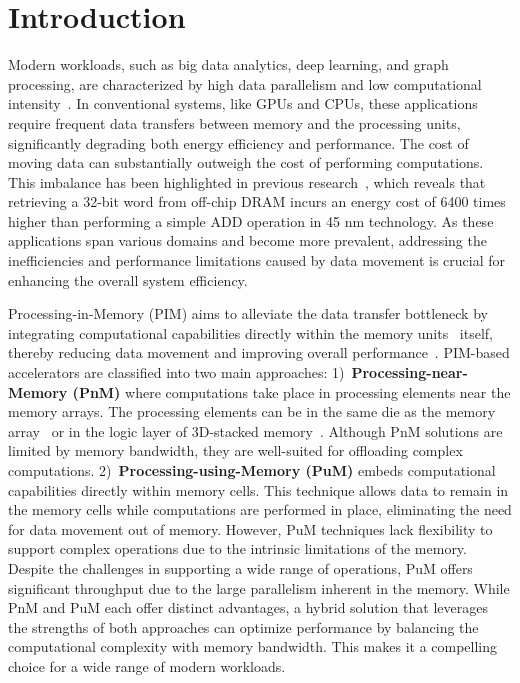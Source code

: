 
\section{Introduction}
Modern workloads, such as big data analytics, deep learning, and graph processing, are characterized by high data parallelism and low computational intensity~\cite{PnM_fpga}. In conventional systems, like GPUs and CPUs, these applications require frequent data transfers between memory and the processing units, significantly degrading both energy efficiency and performance. The cost of moving data can substantially outweigh the cost of performing computations. This imbalance has been highlighted in previous research~\cite{eie}, which reveals that retrieving a 32-bit word from off-chip DRAM incurs an energy cost of 6400 times higher than performing a simple ADD operation in 45 nm technology. As these applications span various domains and become more prevalent, addressing the inefficiencies and performance limitations caused by data movement is crucial for enhancing the overall system efficiency.

Processing-in-Memory (PIM) aims to alleviate the data transfer bottleneck by integrating computational capabilities directly within the memory units~\cite{ghoseprocessing} itself, thereby reducing data movement and improving overall performance~\cite{mutluprocessing}. PIM-based accelerators are classified into two main approaches: 1)~\textbf{Processing-near-Memory (PnM)} where computations take place in processing elements near the memory arrays. The processing elements can be in the same die as the memory array~\cite{pimornot,newton} or in the logic layer of 3D-stacked memory~\cite{DNA-TEQ, qeihan, neurocube}. Although PnM solutions are limited by memory bandwidth, they are well-suited for offloading complex computations. 2)~\textbf{Processing-using-Memory (PuM)} embeds computational capabilities directly within memory cells. This technique allows data to remain in the memory cells while computations are performed in place, eliminating the need for data movement out of memory. However, PuM techniques lack flexibility to support complex operations due to the intrinsic limitations of the memory. Despite the challenges in supporting a wide range of operations, PuM offers significant throughput due to the large parallelism inherent in the memory. While PnM and PuM each offer distinct advantages, a hybrid solution that leverages the strengths of both approaches can optimize performance by balancing the computational complexity with memory bandwidth. This makes it a compelling choice for a wide range of modern workloads.

